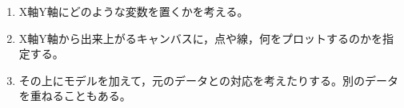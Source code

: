 \begin{enumerate}
	\item X軸Y軸にどのような変数を置くかを考える。
	\item X軸Y軸から出来上がるキャンバスに，点や線，何をプロットするのかを指定する。
	\item その上にモデルを加えて，元のデータとの対応を考えたりする。別のデータを重ねることもある。
\end{enumerate}
